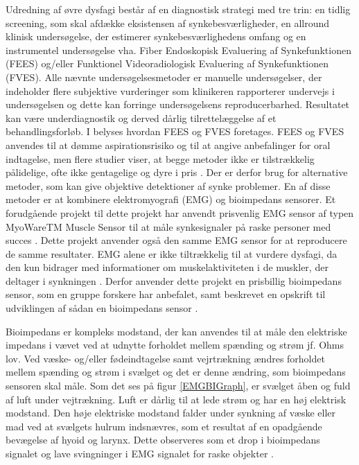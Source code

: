 Udredning af øvre dysfagi består af en diagnostisk strategi med tre trin: en tidlig screening, som skal afdække eksistensen af synkebesværligheder, en allround klinisk undersøgelse, der estimerer synkebesværlighedens omfang og en instrumentel undersøgelse vha. Fiber Endoskopisk Evaluering af Synkefunktionen (FEES) og/eller Funktionel Videoradiologisk Evaluering af Synkefunktionen (FVES). Alle nævnte undersøgelsesmetoder er manuelle undersøgelser, der indeholder flere subjektive vurderinger som klinikeren rapporterer undervejs i undersøgelsen og dette kan forringe undersøgelsens reproducerbarhed. Resultatet kan være underdiagnostik og derved dårlig tilrettelæggelse af et behandlingsforløb. I  belyses hvordan FEES og FVES foretages. FEES og FVES anvendes til at dømme aspirationsrisiko og til at angive anbefalinger for oral indtagelse, men flere studier viser, at begge metoder ikke er tilstrækkelig pålidelige,  ofte ikke gentagelige og dyre i pris \cite{Kelly2006} \cite{McCullough2001Inter-Measures} \cite{Schultheiss2014} \cite{Nahrstaedt2012SwallowMeasurements}.  Der er derfor brug for alternative metoder, som kan give objektive detektioner af synke problemer. En af disse metoder er at kombinere elektromyografi (EMG) og bioimpedans sensorer. Et forudgående projekt til dette projekt har anvendt prisvenlig EMG sensor af typen MyoWareTM Muscle Sensor til at måle synkesignaler på raske personer med succes \cite[s. 58]{ChristensenElisabethLundbakStrand2017}. Dette projekt anvender også den samme EMG sensor for at reproducere de samme resultater. EMG alene er ikke tiltrækkelig til at vurdere dysfagi, da den kun bidrager med informationer om muskelaktiviteten i de muskler, der deltager i synkningen \cite{Schultheiss2014}. Derfor anvender dette projekt en prisbillig bioimpedans sensor, som en gruppe forskere har anbefalet, samt beskrevet en opskrift til udviklingen af sådan en bioimpedans sensor \cite{Aroom2009}.

Bioimpedans er kompleks modstand, der kan anvendes til at måle den elektriske impedans i vævet ved at udnytte forholdet mellem spænding og strøm jf. Ohms lov. Ved væske- og/eller fødeindtagelse samt vejrtrækning ændres forholdet mellem spænding og strøm i svælget og det er denne ændring, som bioimpedans sensoren skal måle. Som det ses på figur \ref{EMGBIGraph}, er svælget åben og fuld af luft under vejtrækning. Luft er dårlig til at lede strøm og har en høj elektrisk modstand. Den høje elektriske modstand falder under synkning af væske eller mad ved at svælgets hulrum indsnævres, som et resultat af en opadgående bevægelse af hyoid og larynx. Dette observeres som et drop i bioimpedans signalet og lave svingninger i EMG signalet for raske objekter \cite{Schultheiss2014}.          



